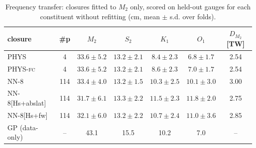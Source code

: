 \begin{table}[t]\centering\footnotesize
\caption{Frequency transfer: closures fitted to $M_2$ only, scored on held-out gauges for each constituent without refitting (cm, mean $\pm$ s.d. over folds).}
\label{tab:transfer}
\begin{tabular}{lcccccc}
\toprule
closure & \#p & $M_2$ & $S_2$ & $K_1$ & $O_1$ & $D_{M_2}$ [TW] \\
\midrule
\textsc{PHYS} & 4 & $33.6\pm5.2$ & $13.2\pm2.1$ & $8.4\pm2.3$ & $6.8\pm1.7$ & 2.54 \\
\textsc{PHYS-fc} & 4 & $33.6\pm5.2$ & $13.2\pm2.1$ & $8.6\pm2.3$ & $7.0\pm1.7$ & 2.54 \\
\textsc{NN-8} & 114 & $33.4\pm4.0$ & $13.2\pm1.5$ & $10.3\pm2.5$ & $10.1\pm3.0$ & 3.00 \\
\textsc{NN-8}[Hs+abslat] & 114 & $31.7\pm6.1$ & $13.3\pm2.2$ & $11.5\pm2.3$ & $11.8\pm2.0$ & 2.75 \\
\textsc{NN-8}[Hs+fw] & 114 & $32.1\pm6.0$ & $13.2\pm2.2$ & $10.7\pm2.4$ & $11.0\pm3.6$ & 2.85 \\
GP (data-only) & -- & 43.1 & 15.5 & 10.2 & 7.0 & -- \\
\bottomrule
\end{tabular}
\end{table}
